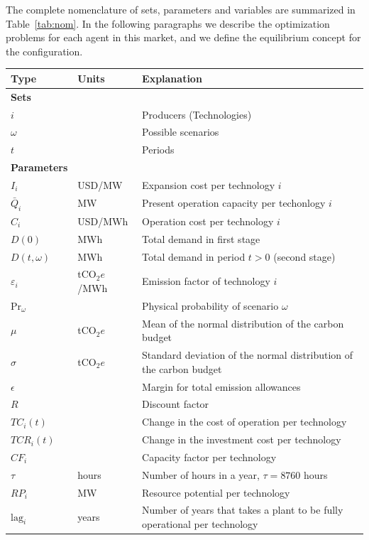 \documentclass[11pt, letterpaper]{article}
\begin{document}
\smallskip
The complete nomenclature of sets, parameters and variables are summarized in Table~\ref{tab:nom}. In the following paragraphs we describe the optimization problems for each agent in this market, and we define the equilibrium concept for the configuration.

\smallskip
\begin{table}
\small
    \centering
    \begin{tabular}{  l l l } 
    \hline
 \textbf{Type} &   \textbf{Units} &   \textbf{Explanation} \\ 
 \hline
 \textbf{Sets}  & &   \\ 
 $i$  & &  Producers (Technologies) \\  
 $\omega$  & & Possible scenarios \\ 
 $t$  & & Periods \\
 \hline
 \textbf{Parameters}  &  &  \\
 $I_i$  & USD/MW & Expansion cost per technology $i$ \\  
 $\bar{Q}_i$ & MW & Present operation capacity  per techonlogy $i$ \\ 
 $C_i$ &  USD/MWh & Operation cost per technology $i$ \\
 $D(0)$ &  MWh & Total demand in first stage \\
 $D(t,\omega)$ &  MWh & Total demand in period $t > 0$ (second stage) \\
 $\varepsilon_i$ &  tCO$_2e$/MWh  & Emission factor of technology $i$\\
 Pr$_\omega$ &  & Physical probability of scenario $\omega$ \\
 $\mu$ &  tCO$_2e$ & Mean of the normal distribution of the carbon budget \\
  $\sigma$ &  tCO$_2e$ & Standard deviation of the normal distribution of the carbon budget \\
  $\epsilon$ &  & Margin for total emission allowances \\
  $R$ & & Discount factor \\
  $TC_i(t)$ &  & Change in the cost of operation per technology \\
  $TCR_i(t)$ & & Change in the investment cost per technology \\
  $CF_i$ &  & Capacity factor per technology\\
  $\tau$ &  hours&  Number of hours in a year, $\tau=8760$ hours\\
   $RP_i$  &   MW &  Resource potential per technology \\
   $\textrm{lag}_i$ & years & Number of years that takes a plant to be fully operational per technology\\

\end{tabular}
\end{table}
\end{document}
